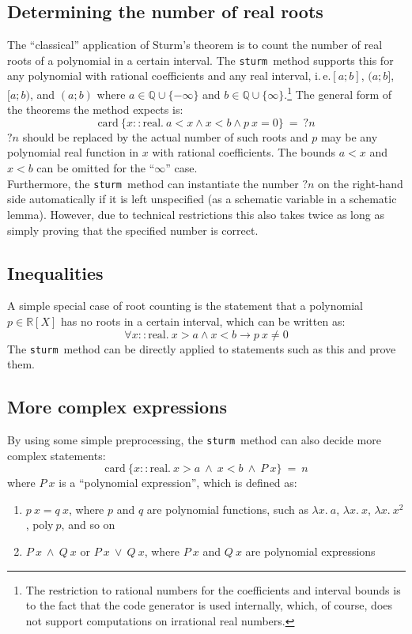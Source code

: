 \documentclass[11pt,a4paper,oneside]{article}
\newcommand{\ie}{i.\,e.}
\newcommand{\RR}{\mathbb{R}}
\newcommand{\QQ}{\mathbb{Q}}
\newcommand{\sturm}{\texttt{sturm}}
\newcommand{\card}{\textrm{card}}
\newcommand{\real}{\textrm{real}}
\begin{document}
\subsection{Determining the number of real roots}
The \enquote{classical} application of Sturm's theorem is to count the number of real roots of a polynomial in a certain interval. The \sturm\ method supports this for any polynomial with rational coefficients and any real interval, \ie $[a;b]$, $(a;b]$, $[a;b)$, and $(a;b)$ where $a\in\QQ\cup\{-\infty\}$ and $b\in\QQ\cup\{\infty\}$.\footnote{The restriction to rational numbers for the coefficients and interval bounds is to the fact that the code generator is used internally, which, of course, does not support computations on irrational real numbers.} The general form of the theorems the method expects is:
$$\card\ \{x::\real.\ a < x \wedge x < b \wedge p\ x = 0\}\ =\ ?n$$
$?n$ should be replaced by the actual number of such roots and $p$ may be any polynomial real function in $x$ with rational coefficients. The bounds $a < x$ and $x < b$ can be omitted for the \enquote{$\infty$} case.\\

Furthermore, the \sturm\ method can instantiate the number $?n$ on the right-hand side automatically if it is left unspecified (as a schematic variable in a schematic lemma). However, due to technical restrictions this also takes twice as long as simply proving that the specified number is correct.

\subsection{Inequalities}

A simple special case of root counting is the statement that a polynomial $p\in\RR[X]$ has no roots in a certain interval, which can be written as:
$$\forall x::\real.\ x > a \wedge x < b \longrightarrow p\ x \neq 0$$
The \sturm\ method can be directly applied to statements such as this and prove them.

\subsection{More complex expressions}

By using some simple preprocessing, the \sturm\ method can also decide more complex statements:
$$\card\ \{x::\real.\ x > a\ \wedge\ x < b\ \wedge\ P\ x\}\ =\ n$$
where $P\ x$ is a \enquote{polynomial expression}, which is defined as:
\begin{enumerate}
\item $p\ x= q\ x$, where $p$ and $q$ are polynomial functions, such as $\lambda x.\ a$, $\lambda x.\ x$, $\lambda x.\ x^2$, $\mathrm{poly}\ p$, and so on
\item $P\ x\ \wedge\ Q\ x$ or $P\ x\ \vee\ Q\ x$, where $P\ x$ and $Q\ x$ are polynomial expressions
\end{enumerate}
\end{document}
